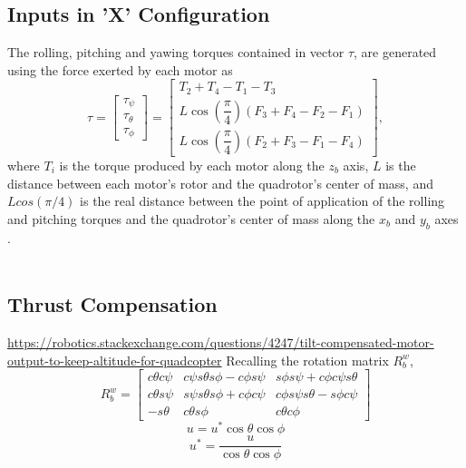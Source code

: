 \subsection{Inputs in 'X' Configuration}
The rolling, pitching and yawing torques contained in vector $\tau$, are generated using the force exerted by each motor as 
\begin{equation}
	\tau = \begin{bmatrix}
	\tau_{\psi}\\[5pt]
	\tau_{\theta}\\[5pt]
	\tau_{\phi}
	\end{bmatrix} = \begin{bmatrix}
								T_{2} + T_{4} - T_{1} - T_{3}\\[5pt]
								L \cos\left(\dfrac{\pi}{4}\right)(F_{3}+F_{4}-F_{2}-F_{1})\\[10pt]
								L \cos\left(\dfrac{\pi}{4}\right)(F_{2}+F_{3}-F_{1}-F_{4})
							\end{bmatrix},
	\label{ec:torques}						
\end{equation}
where $ T_{i} $ is the torque produced by each motor along the $z_{b}$ axis, $ L $ is the distance between each motor's rotor and the quadrotor's center of mass, and $L cos(\pi/4)$ is the real distance between the point of application of the rolling and pitching torques and the quadrotor's center of mass along the $x_b$ and $y_b$ axes \cite{Faessler2016}.\\\\

\subsection{Thrust Compensation}
\url{https://robotics.stackexchange.com/questions/4247/tilt-compensated-motor-output-to-keep-altitude-for-quadcopter}
Recalling the rotation matrix $R_{b}^{w}$,
\begin{equation}
R_{b}^{w} = \begin{bmatrix}
c\theta c\psi & c\psi s\theta s\phi-c\phi s\psi & s\phi s\psi+c\phi c\psi s\theta\\
c\theta s\psi & s\psi s\theta s\phi+c\phi c\psi & c\phi s\psi s\theta - s\phi c\psi\\
-s\theta & c\theta s\phi & c\theta c\phi
\end{bmatrix}
\end{equation}
\begin{equation}
u = u^{*} \cos{\theta}\cos{\phi}
\end{equation}
\begin{equation}
u^{*} = \dfrac{u}{\cos{\theta}\cos{\phi}}
\end{equation}
